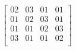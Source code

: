 \[
  \begin{bmatrix}
    02 & 03 & 01 & 01 \\
    01 & 02 & 03 & 01 \\
    01 & 01 & 02 & 03 \\
    03 & 01 & 01 & 02 \\
  \end{bmatrix}
\]